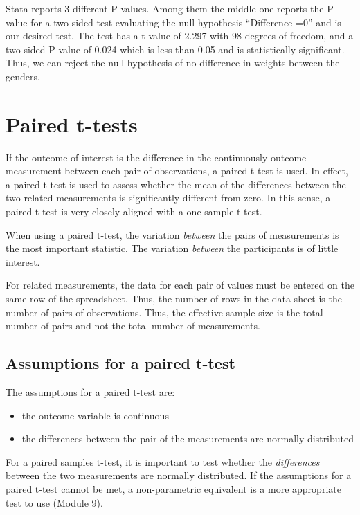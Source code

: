 \documentclass[
]{memoir}
\providecommand{\tightlist}{%
  \setlength{\itemsep}{0pt}\setlength{\parskip}{0pt}}
\begin{document}
Stata reports 3 different P-values. Among them the middle one reports the P-value for a two-sided test evaluating the null hypothesis ``Difference =0'' and is our desired test. The test has a t-value of 2.297 with 98 degrees of freedom, and a two-sided P value of 0.024 which is less than 0.05 and is statistically significant. Thus, we can reject the null hypothesis of no difference in weights between the genders.

\hypertarget{paired-t-tests}{%
\section{Paired t-tests}\label{paired-t-tests}}

If the outcome of interest is the difference in the continuously outcome measurement between each pair of observations, a paired t-test is used. In effect, a paired t-test is used to assess whether the mean of the differences between the two related measurements is significantly different from zero. In this sense, a paired t-test is very closely aligned with a one sample t-test.

When using a paired t-test, the variation \emph{between} the pairs of measurements is the most important statistic. The variation \emph{between} the participants is of little interest.

For related measurements, the data for each pair of values must be entered on the same row of the spreadsheet. Thus, the number of rows in the data sheet is the number of pairs of observations. Thus, the effective sample size is the total number of pairs and not the total number of measurements.

\hypertarget{assumptions-for-a-paired-t-test}{%
\subsection{Assumptions for a paired t-test}\label{assumptions-for-a-paired-t-test}}

The assumptions for a paired t-test are:

\begin{itemize}
\tightlist
\item
  the outcome variable is continuous
\item
  the differences between the pair of the measurements are normally distributed
\end{itemize}

For a paired samples t-test, it is important to test whether the \emph{differences} between the two measurements are normally distributed. If the assumptions for a paired t-test cannot be met, a non-parametric equivalent is a more appropriate test to use (Module 9).
\end{document}
